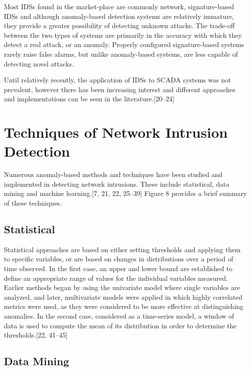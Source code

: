 \documentclass[11pt,]{article}
\begin{document}
Most IDSs found in the market-place are commonly network,
signature-based IDSs and although anomaly-based detection systems are
relatively immature, they provide a greater possibility of detecting
unknown attacks. The trade-off between the two types of systems are
primarily in the accuracy with which they detect a real attack, or an
anomaly. Properly configured signature-based systems rarely raise false
alarms, but unlike anomaly-based systems, are less capable of detecting
novel attacks.

Until relatively recently, the application of IDSs to SCADA systems was
not prevalent, however there has been increasing interest and different
approaches and implementations can be seen in the
literature.{[}20--24{]}

\newpage

\section{Techniques of Network Intrusion
Detection}\label{techniques-of-network-intrusion-detection}

Numerous anomaly-based methods and techniques have been studied and
implemented in detecting network intrusions. These include statistical,
data mining and machine learning.{[}7, 21, 22, 25--39{]} Figure 8
provides a brief summary of these techniques.

\subsection{Statistical}\label{statistical}

Statistical approaches are based on either setting thresholds and
applying them to specific variables, or are based on changes in
distributions over a period of time observed. In the first case, an
upper and lower bound are established to define an appropriate range of
values for the individual variables measured. Earlier methods began by
using the univariate model where single variables are analyzed, and
later, multivariate models were applied in which highly correlated
metrics were used, as they were considered to be more effective at
distinguishing anomalies. In the second case, considered as a
time-series model, a window of data is used to compute the mean of its
distribution in order to determine the thresholds.{[}22, 41--45{]}

\subsection{Data Mining}\label{data-mining}
\end{document}
